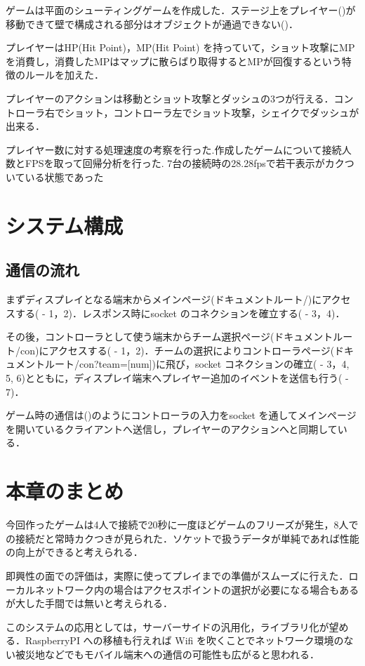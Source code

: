 ゲームは平面のシューティングゲームを作成した．ステージ上をプレイヤー()が移動できて壁で構成される部分はオブジェクトが通過できない()．

プレイヤーはHP(Hit Point)，MP(Hit Point) を持っていて，ショット攻撃にMPを消費し，消費したMPはマップに散らばり取得するとMPが回復するという特徴のルールを加えた．

プレイヤーのアクションは移動とショット攻撃とダッシュの3つが行える．コントローラ右でショット，コントローラ左でショット攻撃，シェイクでダッシュが出来る．

プレイヤー数に対する処理速度の考察を行った.作成したゲームについて接続人数とFPSを取って回帰分析を行った.
7台の接続時の28.28fpsで若干表示がカクついている状態であった


\newpage
\section{システム構成}
\subsection{通信の流れ}
まずディスプレイとなる端末からメインページ(ドキュメントルート/)にアクセスする( - 1，2)．レスポンス時にsocket のコネクションを確立する( - 3，4)．

その後，コントローラとして使う端末からチーム選択ページ(ドキュメントルート/con)にアクセスする( - 1，2)．チームの選択によりコントローラページ(ドキュメントルート/con?team=[num])に飛び，socket コネクションの確立( - 3，4, 5, 6)とともに，ディスプレイ端末へプレイヤー追加のイベントを送信も行う( - 7)．

ゲーム時の通信は()のようにコントローラの入力をsocket を通してメインページを開いているクライアントへ送信し，プレイヤーのアクションへと同期している．


\newpage

\section{本章のまとめ}
今回作ったゲームは4人で接続で20秒に一度ほどゲームのフリーズが発生，8人での接続だと常時カクつきが見られた．ソケットで扱うデータが単純であれば性能の向上ができると考えられる．

即興性の面での評価は，実際に使ってプレイまでの準備がスムーズに行えた．ローカルネットワーク内の場合はアクセスポイントの選択が必要になる場合もあるが大した手間では無いと考えられる．


このシステムの応用としては，サーバーサイドの汎用化，ライブラリ化が望める．RaspberryPI への移植も行えれば Wifi を吹くことでネットワーク環境のない被災地などでもモバイル端末への通信の可能性も広がると思われる．

\newpage
